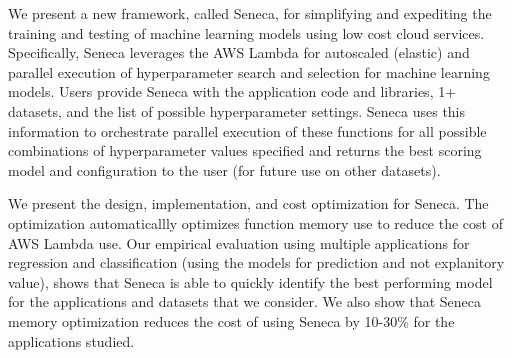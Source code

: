 
We present a new framework, called Seneca, for simplifying and expediting
the training and testing of machine learning models
using low cost cloud services.
Specifically, Seneca leverages the AWS Lambda for autoscaled
(elastic) and parallel execution of hyperparameter search 
and selection for machine learning models.  
Users provide Seneca with the application code and libraries, 1+ datasets, and the list 
of possible hyperparameter settings.  
Seneca uses this information to orchestrate parallel execution of these functions for all possible 
combinations of hyperparameter values specified and returns the best scoring model
and configuration to the user (for future use on other datasets).

We present the design, implementation, and cost optimization for Seneca.
The optimization automaticallly optimizes function memory use to reduce the cost
of AWS Lambda use.  Our empirical evaluation using
multiple applications for regression and classification (using
the models for prediction and not explanitory value), shows that Seneca is able to quickly
identify the best performing model for the applications and datasets that we consider.  
We also show that Seneca memory optimization reduces the cost of using
Seneca by 10-30\% for the applications studied.


